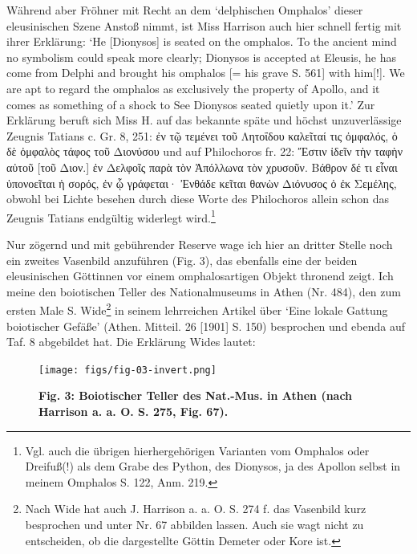 \documentclass[a4paper, 11pt, oneside]{article}
\begin{document}
Während aber Fröhner mit Recht an dem `delphischen Omphalos' dieser eleusinischen Szene Anstoß nimmt, ist Miss Harrison auch hier schnell fertig mit ihrer Erklärung: `He [Dionysos] is seated on the omphalos. To the ancient mind no symbolism could speak more clearly; Dionysos is accepted at Eleusis, he has come from Delphi and brought his omphalos [= his grave S. 561] with him[!]. We are apt to regard the omphalos as exclusively the property of Apollo, and it comes as something of a shock to See Dionysos seated quietly upon it.' Zur Erklärung beruft sich Miss H. auf das bekannte späte und höchst unzuverlässige Zeugnis Tatians c. Gr. 8, 251: ἐν τῷ τεμένει τοῦ Λητοΐδου καλεῖταί τις ὀμφαλός, ὁ δὲ ὀμφαλὸς τάφος τοῦ Διονύσου und auf Philochoros fr. 22: Ἔστιν ἰδεῖν τὴν ταφὴν αὐτοῦ [τοῦ Διον.] ἐν Δελφοῖς παρὰ τὸν Ἀπόλλωνα τὸν χρυσοῦν. Βάθρον δέ τι εἶναι ὑπονοεῖται ἡ σορός, ἐν ᾧ γράφεται· Ἐνθάδε κεῖται θανὼν Διόνυσος ὁ ἐκ Σεμέλης, obwohl bei Lichte besehen durch diese Worte des Philochoros allein schon das Zeugnis Tatians endgültig widerlegt wird.\footnote{Vgl. auch die übrigen hierhergehörigen Varianten vom Omphalos oder Dreifuß(!) als dem Grabe des Python, des Dionysos, ja des Apollon selbst in meinem Omphalos S. 122, Anm. 219.}

Nur zögernd und mit gebührender Reserve wage ich hier an dritter Stelle noch ein zweites Vasenbild anzuführen (Fig. 3), das ebenfalls eine der beiden eleusinischen Göttinnen vor einem omphalosartigen Objekt thronend zeigt. Ich meine den boiotischen Teller des Nationalmuseums in Athen (Nr. 484), den zum ersten Male S. Wide\footnote{Nach Wide hat auch J. Harrison a. a. O. S. 274 f. das Vasenbild kurz besprochen und unter Nr. 67 abbilden lassen. Auch sie wagt nicht zu entscheiden, ob die dargestellte Göttin Demeter oder Kore ist.} in seinem lehrreichen Artikel über `Eine lokale Gattung boiotischer Gefäße' (Athen. Mitteil. 26 [1901] S. 150) besprochen und ebenda auf Taf. 8 abgebildet hat. Die Erklärung Wides lautet:

\begin{figure}[H]
\centering
\texttt{[image: figs/fig-03-invert.png]}
\caption{\bfseries Fig. 3: Boiotischer Teller des Nat.-Mus. in Athen (nach Harrison a. a. O. S. 275, Fig. 67).}
\end{figure}
\end{document}
